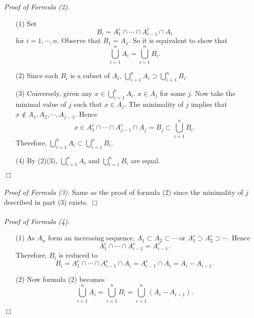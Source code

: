\documentclass{article}
\begin{document}
\emph{Proof of Formula (2).}
\begin{enumerate}
\item[(1)]
  Set
  \[
    B_i = A_1^{c} \cap \cdots \cap A_{i-1}^{c} \cap A_i
  \]
  for $i = 1, \cdots, n$.
  Observe that $B_1 = A_1$.
  So it is equivalent to show that
  \[
    \bigcup_{i=1}^{n} A_i = \bigcup_{i=1}^{n} B_i.
  \]

\item[(2)]
  Since each $B_i$ is a subset of $A_i$,
  $\bigcup_{i=1}^{n} A_i \supset \bigcup_{i=1}^{n} B_i$.

\item[(3)]
  Conversely, given any $x \in \bigcup_{i=1}^{n} A_i$.
  $x \in A_j$ for some $j$.
  Now take the minimal value of $j$ such that $x \in A_j$.
  The minimality of $j$ implies that $x \notin A_1, A_2, \cdots, A_{j-1}$.
  Hence
  \[
    x
    \in A_1^{c} \cap \cdots \cap A_{j-1}^{c} \cap A_j
    = B_j \subset \bigcup_{i=1}^{n} B_i.
  \]
  Therefore, $\bigcup_{i=1}^{n} A_i \subset \bigcup_{i=1}^{n} B_i$.

\item[(4)]
  By (2)(3), $\bigcup_{i=1}^{n} A_i$ and $\bigcup_{i=1}^{n} B_i$ are equal.
\end{enumerate}
$\Box$ \\\\



\emph{Proof of Formula (3).}
  Same as the proof of formula (2)
  since the minimality of $j$ described in part (3) exists.
$\Box$ \\\\



\emph{Proof of Formula (4).}
\begin{enumerate}
\item[(1)]
  As $A_n$ form an increasing sequence,
  $A_1 \subset A_2 \subset \cdots$ or
  $A_1^{c} \supset A_2^{c} \supset \cdots$.
  Hence
  \[
    A_1^{c} \cap \cdots \cap A_{i-1}^{c} = A_{i-1}^c.
  \]
  Therefore, $B_i$ is reduced to
  \[
    B_i
    = A_1^{c} \cap \cdots \cap A_{i-1}^{c} \cap A_i
    = A_{i-1}^{c} \cap A_i
    = A_{i} - A_{i-1}.
  \]

\item[(2)]
  Now formula (2) becomes
  \[
    \bigcup_{i=1}^{n} A_i
    = \bigcup_{i=1}^{n} B_i
    = \bigcup_{i=1}^{n} (A_{i} - A_{i-1}).
  \]
\end{enumerate}
$\Box$ \\\\
\end{document}
